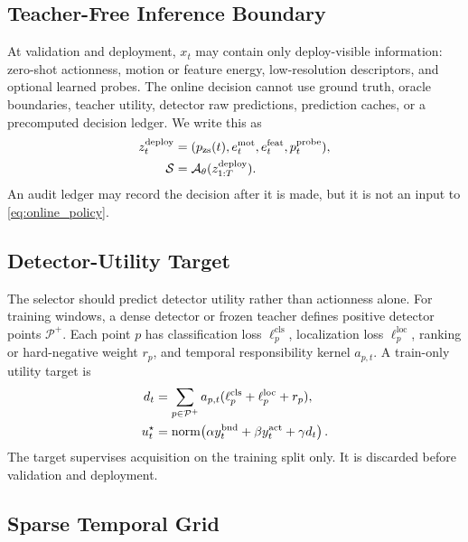 \subsection{Teacher-Free Inference Boundary}

At validation and deployment, $x_t$ may contain only deploy-visible information:
zero-shot actionness, motion or feature energy, low-resolution descriptors, and
optional learned probes. The online decision cannot use ground truth, oracle
boundaries, teacher utility, detector raw predictions, prediction caches, or a
precomputed decision ledger. We write this as
\begin{align}
    z^{\mathrm{deploy}}_t
    &=
    (p_{\mathrm{zs}}(t), e^{\mathrm{mot}}_t, e^{\mathrm{feat}}_t, p^{\mathrm{probe}}_t),
    \notag\\
    \mathcal{S}
    &=
    \mathcal{A}_{\theta}(z^{\mathrm{deploy}}_{1:T}).
    \label{eq:deploy_boundary}
\end{align}
An audit ledger may record the decision after it is made, but it is not an
input to \cref{eq:online_policy}.

\subsection{Detector-Utility Target}

The selector should predict detector utility rather than actionness alone. For
training windows, a dense detector or frozen teacher defines positive detector
points $\mathcal{P}^{+}$. Each point $p$ has classification loss
$\ell^{\mathrm{cls}}_p$, localization loss $\ell^{\mathrm{loc}}_p$, ranking or
hard-negative weight $r_p$, and temporal responsibility kernel $a_{p,t}$. A
train-only utility target is
\begin{align}
    d_t &=
      \sum_{p\in\mathcal{P}^{+}}
      a_{p,t}
      (\ell^{\mathrm{cls}}_p+\ell^{\mathrm{loc}}_p+r_p),
      \notag\\
    u^{\star}_t &=
    \mathrm{norm}\!\left(
      \alpha y^{\mathrm{bnd}}_t
      + \beta y^{\mathrm{act}}_t
      + \gamma d_t
    \right).
    \label{eq:utility_target}
\end{align}
The target supervises acquisition on the training split only. It is discarded
before validation and deployment.

\subsection{Sparse Temporal Grid}

